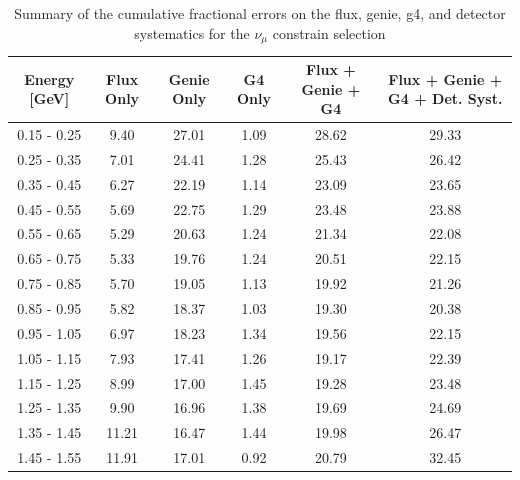 \begin{table}[H]
\centering
\begin{tabular}{| c | c | c | c | c | c |}
\hline
Energy [GeV] & Flux Only & Genie Only  & G4 Only & Flux + Genie + G4 & Flux + Genie + G4 + Det. Syst. \\
\hline
0.15 - 0.25 & 9.40 & 27.01 & 1.09 & 28.62 & 29.33 \\
0.25 - 0.35 & 7.01 & 24.41 & 1.28 & 25.43 & 26.42 \\
0.35 - 0.45 & 6.27 & 22.19 & 1.14 & 23.09 & 23.65 \\
0.45 - 0.55 & 5.69 & 22.75 & 1.29 & 23.48 & 23.88 \\
0.55 - 0.65 & 5.29 & 20.63 & 1.24 & 21.34 & 22.08 \\
0.65 - 0.75 & 5.33 & 19.76 & 1.24 & 20.51 & 22.15 \\
0.75 - 0.85 & 5.70 & 19.05 & 1.13 & 19.92 & 21.26 \\
0.85 - 0.95 & 5.82 & 18.37 & 1.03 & 19.30 & 20.38 \\
0.95 - 1.05 & 6.97 & 18.23 & 1.34 & 19.56 & 22.15 \\
1.05 - 1.15 & 7.93 & 17.41 & 1.26 & 19.17 & 22.39 \\
1.15 - 1.25 & 8.99 & 17.00 & 1.45 & 19.28 & 23.48 \\
1.25 - 1.35 & 9.90 & 16.96 & 1.38 & 19.69 & 24.69 \\
1.35 - 1.45 & 11.21 & 16.47 & 1.44 & 19.98 & 26.47 \\
1.45 - 1.55 & 11.91 & 17.01 & 0.92 & 20.79 & 32.45 \\
\hline
\end{tabular}
\caption{Summary of the cumulative fractional errors on the flux, genie, g4, and detector systematics for the $\nu_\mu$ constrain selection}
\label{tab:numu_boxcut_errors}
\end{table}